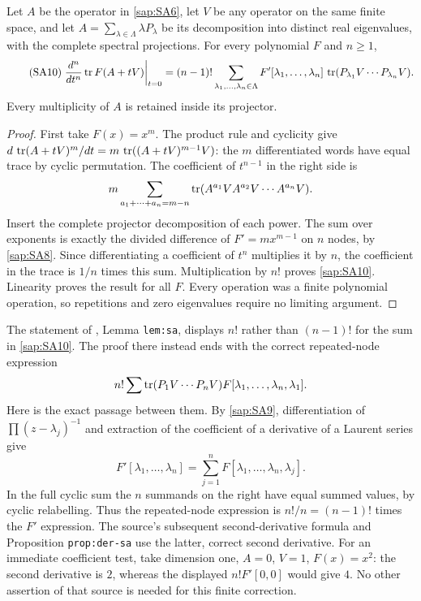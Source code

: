 \documentclass[11pt]{article}
\begin{document}
\begin{saptheorem}\label{sap:thm:cyclic}
Let $A$ be the operator in \eqref{sap:SA6}, let $V$ be any
operator on the same finite space, and let
$A=\sum_{\lambda\in\Lambda}\lambda P_\lambda$ be its
decomposition into distinct real eigenvalues, with the
complete spectral projections. For every polynomial $F$
and $n\geq1$,
\begin{equation}\tag{SA10}\label{sap:SA10}
\left.\frac{d^n}{dt^n}\operatorname{tr} F(A+tV)\right|_{t=0}
=(n-1)!\sum_{\lambda_1,\ldots,\lambda_n\in\Lambda}
F'[\lambda_1,\ldots,\lambda_n]\,
\operatorname{tr}(P_{\lambda_1}V\cdots P_{\lambda_n}V).
\end{equation}
Every multiplicity of $A$ is retained inside its projector.
\end{saptheorem}
\begin{proof}
First take $F(x)=x^m$. The product rule and cyclicity give
$d\,\operatorname{tr}(A+tV)^m/dt=m\,\operatorname{tr}((A+tV)^{m-1}V)$:
the $m$ differentiated words have equal trace by cyclic
permutation. The coefficient of $t^{n-1}$ in the right
side is
\[
m\sum_{a_1+\cdots+a_n=m-n}
\operatorname{tr}(A^{a_1}V A^{a_2}V\cdots A^{a_n}V).
\]
Insert the complete projector decomposition of each power.
The sum over exponents is exactly the divided difference
of $F'=mx^{m-1}$ on $n$ nodes, by \eqref{sap:SA8}.
Since differentiating a coefficient of $t^n$ multiplies
it by $n$, the coefficient in the trace is $1/n$ times
this sum. Multiplication by $n!$ proves \eqref{sap:SA10}.
Linearity proves the result for all $F$. Every operation
was a finite polynomial operation, so repetitions and
zero eigenvalues require no limiting argument.
\end{proof}

The statement of \cite{sap:CV}, Lemma \texttt{lem:sa}, displays
$n!$ rather than $(n-1)!$ for the sum in \eqref{sap:SA10}.
The proof there instead ends with the correct repeated-node
expression
\[
n!\sum\operatorname{tr}(P_1V\cdots P_nV)F[\lambda_1,\ldots,\lambda_n,\lambda_1].
\]
Here is the exact passage between them. By \eqref{sap:SA9},
differentiation of $\prod(z-\lambda_j)^{-1}$ and extraction
of the coefficient of a derivative of a Laurent series give
\begin{equation}\tag{SA11}\label{sap:SA11}
F'[\lambda_1,\ldots,\lambda_n]
=\sum_{j=1}^n
F[\lambda_1,\ldots,\lambda_n,\lambda_j].
\end{equation}
In the full cyclic sum the $n$ summands on the right
have equal summed values, by cyclic relabelling.
Thus the repeated-node expression is $n!/n=(n-1)!$
times the $F'$ expression. The source's subsequent
second-derivative formula and Proposition
\texttt{prop:der-sa} use the latter, correct second
derivative. For an immediate coefficient test, take
dimension one, $A=0$, $V=1$, $F(x)=x^2$: the second
derivative is $2$, whereas the displayed $n!F'[0,0]$
would give $4$. No other assertion of that source is
needed for this finite correction.
\end{document}
